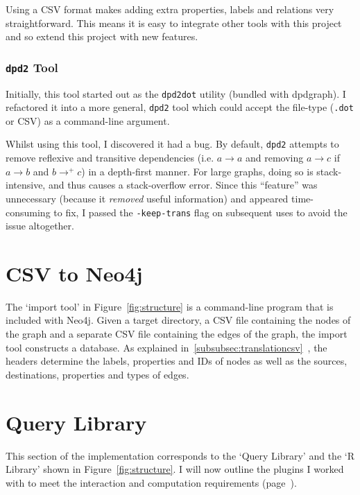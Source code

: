 Using a CSV format makes adding extra properties, labels and relations very
straightforward. This means it is easy to integrate other tools with this
project and so extend this project with new features.

\subsubsection{\texttt{dpd2} Tool}\label{subsubsec:dpd2}

Initially, this tool started out as the \texttt{dpd2dot} utility (bundled with
dpdgraph). I refactored it into a more general, \texttt{dpd2} tool which could
accept the file-type (\texttt{.dot} or CSV) as a command-line argument.

Whilst using this tool, I discovered it had a bug. By default, \texttt{dpd2}
attempts to remove reflexive and transitive dependencies (i.e. $a \rightarrow a$
and removing $a \rightarrow c$ if $a \rightarrow b$ and $b \rightarrow^{+} c$)
in a depth-first manner.  For large graphs, doing so is stack-intensive, and
thus causes a stack-overflow error.  Since this ``feature'' was unnecessary
(because it \emph{removed} useful information) and appeared time-consuming to
fix, I passed the \texttt{-keep-trans} flag on subsequent uses to avoid the issue
altogether.

\section{CSV to Neo4j}

The `import tool' in Figure~\ref{fig:structure} is a command-line program that
is included with Neo4j. Given a target directory, a CSV file containing the
nodes of the graph and a separate CSV file containing the edges of the graph,
the import tool constructs a database. As explained
in~\ref{subsubsec:translationcsv}~, the
headers determine the labels, properties and IDs of nodes as well as the
sources, destinations, properties and types of edges.

\section{Query Library}

This section of the implementation corresponds to the `Query Library' and the
`R Library' shown in Figure~\ref{fig:structure}. I will now outline the
plugins I worked with to meet the interaction and computation requirements
(page~\pageref{req:i1}).

